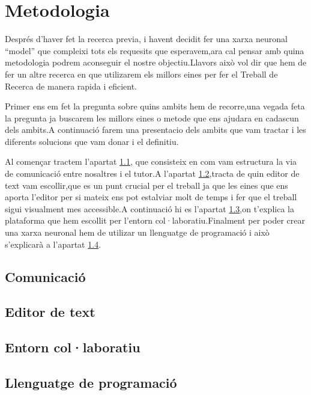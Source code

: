 \chapter{Metodologia}
Després d'haver fet la recerca previa, i havent decidit fer una xarxa neuronal ``model'' que compleixi tots els requesits que esperavem,ara cal pensar amb quina metodologia podrem aconseguir el nostre objectiu.Llavors això vol dir que hem de fer un altre recerca en que utilizarem els millors eines per fer el Treball de Recerca de manera rapida i eficient.

Primer ens em fet la pregunta sobre quins ambits hem de recorre,una vegada feta la pregunta ja buscarem les millors eines o metode que ens ajudara en cadascun dels ambits.A continuació farem una presentacio dels ambits que vam tractar i les diferents solucions que vam donar i el definitiu.

Al començar tractem  l'apartat \ref{4.1}, que consisteix en com vam estructura la via de comunicació entre nosaltres i el tutor.A l'apartat \ref{4.2},tracta de quin editor de text vam escollir,que es un punt crucial per el treball ja que  les eines que ens aporta l'editor per si mateix ens pot estalviar molt de temps i fer que el treball sigui visualment mes accessible.A continuació hi es l'apartat \ref{4.3},on t'explica la plataforma que hem escollit per l'entorn col·laboratiu.Finalment per poder crear una xarxa neuronal hem de utilizar un llenguatge de programació i això s'explicarà a l'apartat \ref{4.4}.




\section{Comunicació}\label{4.1}
\section{Editor de text}\label{4.2}
\section{Entorn col·laboratiu}\label{4.3}
\section{Llenguatge de programació}\label{4.4}

